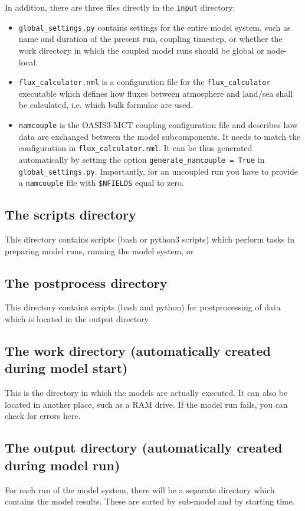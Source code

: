 \documentclass[a4paper,titlepage]{scrartcl}
\begin{document}
In addition, there are three files directly in the \texttt{input} directory:
\begin{itemize}
\item \texttt{global\_settings.py} contains settings for the entire model system, such as name and duration of the present run, coupling timestep, or whether the work directory in which the coupled model runs should be global or node-local.
\item \texttt{flux\_calculator.nml} is a configuration file for the \texttt{flux\_calculator} executable which defines how fluxes between atmosphere and land/sea shall be calculated, i.e. which bulk formulae are used.
\item \texttt{namcouple} is the OASIS3-MCT coupling configuration file and describes how data are exchanged between the model subcomponents. It needs to match the configuration in \texttt{flux\_calculator.nml}. It can be thus generated automatically by setting the option \texttt{generate\_namcouple = True} in \texttt{global\_settings.py}. Importantly, for an uncoupled run you have to provide a \texttt{namcouple} file with \texttt{\$NFIELDS} equal to zero. 
\end{itemize}

\subsection{The scripts directory}
This directory contains scripts (bash or python3 scripts) which perform tasks in preparing model runs, running the model system, or 

\subsection{The postprocess directory}
This directory contains scripts (bash and python) for postprocessing of data which is located in the output directory.

\subsection{The work directory (automatically created during model start)}
This is the directory in which the models are actually executed.
It can also be located in another place, such as a RAM drive.
If the model run fails, you can check for errors here.

\subsection{The output directory (automatically created during model run)}
For each run of the model system, there will be a separate directory which contains the model results.
These are sorted by sub-model and by starting time.
\end{document}
